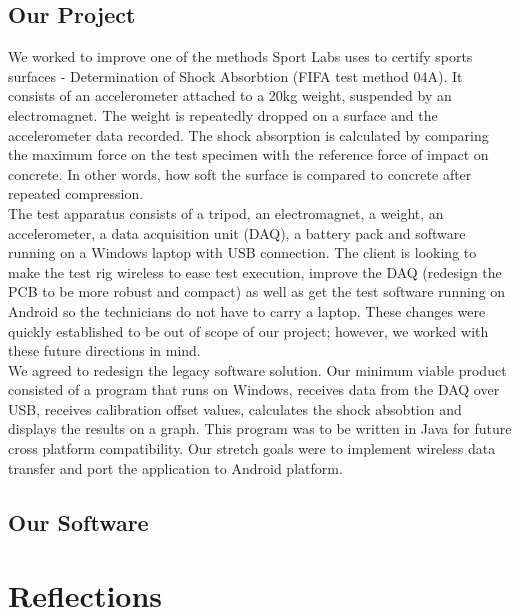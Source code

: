 \documentclass{l3proj}
\begin{document}
\subsection{Our Project}
We worked to improve one of the methods Sport Labs uses to certify sports surfaces - Determination of Shock Absorbtion (FIFA test method 04A). It consists of an accelerometer attached to a 20kg weight, suspended by an electromagnet. The weight is repeatedly dropped on a surface and the accelerometer data recorded. The shock absorption is calculated by comparing the maximum force on the test specimen with the reference force of impact on concrete\cite{fifa}. In other words, how soft the surface is compared to concrete after repeated compression. \\
The test apparatus consists of a tripod, an electromagnet, a weight, an accelerometer, a data acquisition unit (DAQ), a battery pack and software running on a Windows laptop with USB connection. The client is looking to make the test rig wireless to ease test execution, improve the DAQ (redesign the PCB to be more robust and compact) as well as get the test software running on Android so the technicians do not have to carry a laptop. These changes were quickly established to be out of scope of our project; however, we worked with these future directions in mind. \\
We agreed to redesign the legacy software solution. Our minimum viable product consisted of a program that runs on Windows, receives data from the DAQ over USB, receives calibration offset values, calculates the shock absobtion and displays the results on a graph. This program was to be written in Java for future cross platform compatibility. Our stretch goals were to implement wireless data transfer and port the application to Android platform.


\subsection{Our Software}



\section{Reflections}
\end{document}
